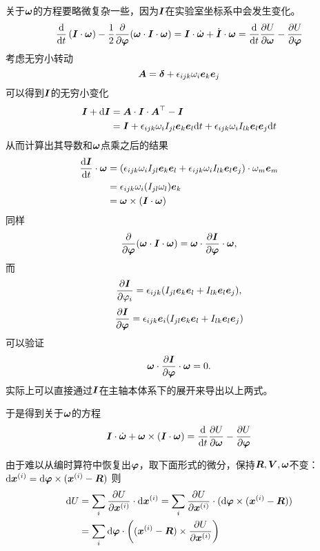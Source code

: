 关于$\vb*{\omega}$的方程要略微复杂一些，因为$\vb*{I}$在实验室坐标系中会发生变化。
\[
    \dv{t} \left( \vb*{I} \cdot \vb*{\omega} \right) - \frac{1}{2} \pdv{\vb*{\varphi}} (\vb*{\omega} \cdot \vb*{I} \cdot \vb*{\omega}) = \vb*{I} \cdot \dot{\vb*{\omega}} + \dot{\vb*{I}} \cdot \vb*{\omega} = \dv{t} \pdv{U}{\vb*{\omega}} - \pdv{U}{\vb*{\varphi}}
\]
考虑无穷小转动
\[
    \vb*{A} = \vb*{\delta} + \epsilon_{ijk} \omega_i \vb*{e}_k \vb*{e}_j
\]
可以得到$\vb*{I}$的无穷小变化
\[
    \begin{aligned}
        \vb*{I} + \dd \vb*{I} &= \vb*{A} \cdot \vb*{I} \cdot \vb*{A}^\top - \vb*{I} \\
        &= \vb*{I} + \epsilon_{ijk} \omega_i I_{jl} \vb*{e}_k \vb*{e}_l \dd t + \epsilon_{ijk} \omega_i I_{lk} \vb*{e}_l \vb*{e}_j \dd t
    \end{aligned}
\]
从而计算出其导数和$\vb*{\omega}$点乘之后的结果
\[
    \begin{aligned}
        \dv{\vb*{I}}{t} \cdot \vb*{\omega} &= (\epsilon_{ijk} \omega_i I_{jl} \vb*{e}_k \vb*{e}_l + \epsilon_{ijk} \omega_i I_{lk} \vb*{e}_l \vb*{e}_j) \cdot \omega_m \vb*{e}_m \\
        &= \epsilon_{ijk} \omega_i (I_{jl} \omega_l) \vb*{e}_k \\
        &= \vb*{\omega} \times (\vb*{I} \cdot \vb*{\omega})
    \end{aligned}
\]
同样
\[
    \pdv{\vb*{\varphi}} (\vb*{\omega} \cdot \vb*{I} \cdot \vb*{\omega}) = \vb*{\omega} \cdot \pdv{\vb*{I}}{\vb*{\varphi}} \cdot \vb*{\omega},
\]
而
\[
    \pdv{\vb*{I}}{\varphi_i} = \epsilon_{ijk} (I_{jl} \vb*{e}_k \vb*{e}_l + I_{lk} \vb*{e}_l \vb*{e}_j),
\]
\[
    \pdv{\vb*{I}}{\vb*{\varphi}} = \epsilon_{ijk} \vb*{e}_i (I_{jl} \vb*{e}_k \vb*{e}_l + I_{lk} \vb*{e}_l \vb*{e}_j) 
\]
可以验证
\[
    \vb*{\omega} \cdot \pdv{\vb*{I}}{\vb*{\varphi}} \cdot \vb*{\omega} = 0.
\]
实际上可以直接通过$\vb*{I}$在主轴本体系下的展开来导出以上两式。

于是得到关于$\vb*{\omega}$的方程
\begin{equation}
    \vb*{I} \cdot \dot{\vb*{\omega}} + \vb*{\omega} \times (\vb*{I} \cdot \vb*{\omega}) = \dv{t} \pdv{U}{\vb*{\omega}} - \pdv{U}{\vb*{\varphi}}
    \label{eq:origin-omega-motion}
\end{equation}

由于难以从编时算符中恢复出$\vb*{\varphi}$，取下面形式的微分，保持$\vb*{R},\vb*{V}, \vb*{\omega}$不变：
$\dd \vb*{x}^{(i)} = \dd \vb*{\varphi} \times (\vb*{x}^{(i)} - \vb*{R})$
则
\[
    \begin{aligned}
        \dd U &= \sum_i \pdv{U}{\vb*{x}^{(i)}} \cdot \dd \vb*{x}^{(i)} = \sum_i  \pdv{U}{\vb*{x}^{(i)}} \cdot (\dd \vb*{\varphi} \times (\vb*{x}^{(i)} - \vb*{R})) \\
        &= \sum_i \dd \vb*{\varphi} \cdot \left( (\vb*{x}^{(i)} - \vb*{R}) \times \pdv{U}{\vb*{x}^{(i)}} \right)
    \end{aligned}
\]

